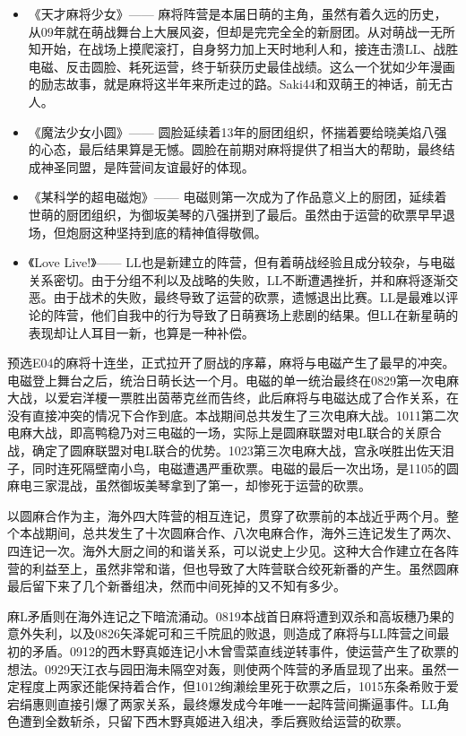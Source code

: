 \begin{itemize}
\item 《天才麻将少女》——
麻将阵营是本届日萌的主角，虽然有着久远的历史，从09年就在萌战舞台上大展风姿，但却是完完全全的新厨团。从对萌战一无所知开始，在战场上摸爬滚打，自身努力加上天时地利人和，接连击溃LL、战胜电磁、反击圆脸、耗死运营，终于斩获历史最佳战绩。这么一个犹如少年漫画的励志故事，就是麻将这半年来所走过的路。Saki44和双萌王的神话，前无古人。
\item 《魔法少女小圆》——
圆脸延续着13年的厨团组织，怀揣着要给晓美焰八强的心态，最后结果算是无憾。圆脸在前期对麻将提供了相当大的帮助，最终结成神圣同盟，是阵营间友谊最好的体现。
\item 《某科学的超电磁炮》——
电磁则第一次成为了作品意义上的厨团，延续着世萌的厨团组织，为御坂美琴的八强拼到了最后。虽然由于运营的砍票早早退场，但炮厨这种坚持到底的精神值得敬佩。
\item 《Love Live!》——
LL也是新建立的阵营，但有着萌战经验且成分较杂，与电磁关系密切。由于分组不利以及战略的失败，LL不断遭遇挫折，并和麻将逐渐交恶。由于战术的失败，最终导致了运营的砍票，遗憾退出比赛。LL是最难以评论的阵营，他们自我中的行为导致了日萌赛场上悲剧的结果。但LL在新星萌的表现却让人耳目一新，也算是一种补偿。
\end{itemize}

预选E04的麻将十连坐，正式拉开了厨战的序幕，麻将与电磁产生了最早的冲突。电磁登上舞台之后，统治日萌长达一个月。电磁的单一统治最终在0829第一次电麻大战，以爱宕洋榎一票胜出茵蒂克丝而告终，此后麻将与电磁达成了合作关系，在没有直接冲突的情况下合作到底。本战期间总共发生了三次电麻大战。1011第二次电麻大战，即高鸭稳乃对三电磁的一场，实际上是圆麻联盟对电L联合的关原合战，确定了圆麻联盟对电L联合的优势。1023第三次电麻大战，宫永咲胜出佐天泪子，同时连死隔壁南小鸟，电磁遭遇严重砍票。电磁的最后一次出场，是1105的圆麻电三家混战，虽然御坂美琴拿到了第一，却惨死于运营的砍票。

以圆麻合作为主，海外四大阵营的相互连记，贯穿了砍票前的本战近乎两个月。整个本战期间，总共发生了十次圆麻合作、八次电麻合作，海外三连记发生了两次、四连记一次。海外大厨之间的和谐关系，可以说史上少见。这种大合作建立在各阵营的利益至上，虽然非常和谐，但也导致了大阵营联合绞死新番的产生。虽然圆麻最后留下来了几个新番组决，然而中间死掉的又不知有多少。

麻L矛盾则在海外连记之下暗流涌动。0819本战首日麻将遭到双杀和高坂穗乃果的意外失利，以及0826矢泽妮可和三千院凪的败退，则造成了麻将与LL阵营之间最初的矛盾。0912的西木野真姬连记小木曾雪菜直线逆转事件，使运营产生了砍票的想法。0929天江衣与园田海未隔空对轰，则使两个阵营的矛盾显现了出来。虽然一定程度上两家还能保持着合作，但1012绚濑绘里死于砍票之后，1015东条希败于爱宕绢惠则直接引爆了两家关系，最终爆发成今年唯一一起阵营间撕逼事件。LL角色遭到全数斩杀，只留下西木野真姬进入组决，季后赛败给运营的砍票。

